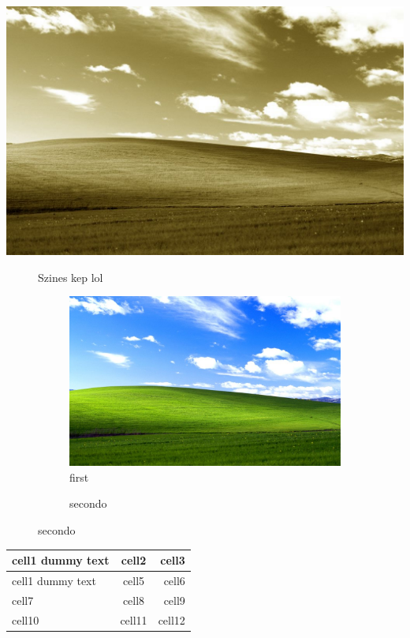 \documentclass{article}
\begin{document}
\listoffigures
\bigbreak
\lipsum[1]

\includegraphics[width=5 cm, height=5 cm, keepaspectratio]{szepia.jpg}	
\lipsum[1]
\begin{figure}[ht]
\centering
\caption{Szines kep lol}
\label{fig:kepek}
	\begin{subfigure}[c]{5cm}
	\centering
	\caption{first}
	\smallbreak
	\includegraphics[width=5 cm, height=5 cm, keepaspectratio]{szines.jpg}
	\end{subfigure}
\hspace{1em} %
\bigbreak
\centering
\caption{Szepias kep lol}
	\begin{subfigure}[c]{5cm}
	\centering
	\caption{secondo}
	\smallbreak
	\end{subfigure}
\end{figure}
\bigbreak

\begin{center}


\begin{tabularx}{10 cm} {l|c|r}
\hline
  \hline
  cell1 dummy text & cell2 & cell3 \\ 
  \hline
  cell1 dummy text & cell5 & cell6 \\ 
  \hline
  cell7 & cell8 & cell9 \\ 
  \hline
   cell10 & cell11 & cell12 \\
  \hline
\end{tabularx}
\end{center}
\end{document}
